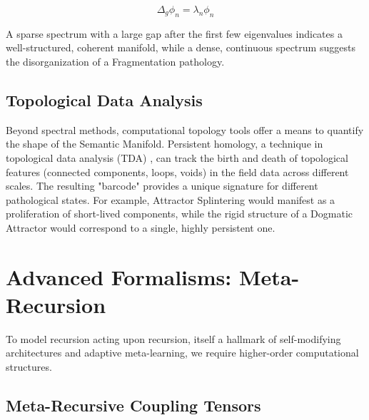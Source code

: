 \begin{equation}
\Delta_g \phi_n = \lambda_n \phi_n
\end{equation}

A sparse spectrum with a large gap after the first few eigenvalues indicates a well-structured, coherent manifold, while a dense, continuous spectrum suggests the disorganization of a Fragmentation pathology.


\subsection{Topological Data Analysis}
\label{17.3.4:topological_data_analysis}

Beyond spectral methods, computational topology tools offer a means to quantify the shape of the Semantic Manifold. Persistent homology, a technique in topological data analysis (TDA) \autocite{EdelsbrunnerHarer2010}, can track the birth and death of topological features (connected components, loops, voids) in the field data across different scales. The resulting "barcode" provides a unique signature for different pathological states. For example, Attractor Splintering would manifest as a proliferation of short-lived components, while the rigid structure of a Dogmatic Attractor would correspond to a single, highly persistent one.


\section{Advanced Formalisms: Meta-Recursion}
\label{17.4:advanced_formalisms_meta_recursion}

To model recursion acting upon recursion, itself a hallmark of self-modifying architectures and adaptive meta-learning, we require higher-order computational structures.


\subsection{Meta-Recursive Coupling Tensors}
\label{17.4.1:meta_recursive_coupling_tensors}

